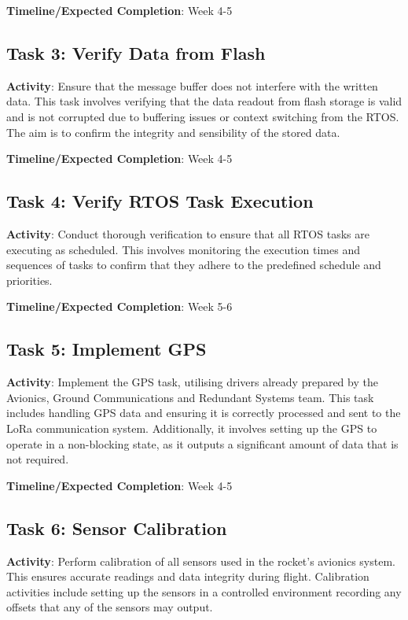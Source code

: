 \textbf{Timeline/Expected Completion}: Week 4-5

\subsection{Task 3: Verify Data from Flash}
\textbf{Activity}: Ensure that the message buffer does not interfere with the written data. This task involves verifying that the data readout from flash storage is valid and is not corrupted due to buffering issues or context switching from the RTOS. The aim is to confirm the integrity and sensibility of the stored data. 

\textbf{Timeline/Expected Completion}: Week 4-5

\subsection{Task 4: Verify RTOS Task Execution}
\textbf{Activity}: Conduct thorough verification to ensure that all RTOS tasks are executing as scheduled. This involves monitoring the execution times and sequences of tasks to confirm that they adhere to the predefined schedule and priorities. 

\textbf{Timeline/Expected Completion}: Week 5-6

\subsection{Task 5: Implement GPS}
\textbf{Activity}: Implement the GPS task, utilising drivers already prepared by the Avionics, Ground Communications and Redundant Systems team. This task includes handling GPS data and ensuring it is correctly processed and sent to the LoRa communication system. Additionally, it involves setting up the GPS to operate in a non-blocking state, as it outputs a significant amount of data that is not required. 

\textbf{Timeline/Expected Completion}: Week 4-5

\subsection{Task 6: Sensor Calibration}
\textbf{Activity}: Perform calibration of all sensors used in the rocket's avionics system. This ensures accurate readings and data integrity during flight. Calibration activities include setting up the sensors in a controlled environment recording any offsets that any of the sensors may output.

